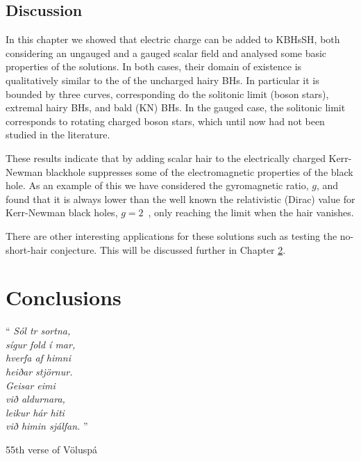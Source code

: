 \section{Discussion}
\label{sec_remarks}

In this chapter we showed that electric charge can be added to KBHsSH, both considering an ungauged and a gauged scalar field and analysed some basic properties of the solutions.
In both cases, their domain of existence is qualitatively similar to the of the uncharged hairy BHs.
In particular it is bounded by three curves, corresponding do the solitonic limit (boson stars), extremal hairy BHs, and bald (KN) BHs.
In the gauged case, the solitonic limit corresponds to rotating charged boson stars, which until now had not been studied in the literature. 

These results indicate that by adding scalar hair to the electrically charged Kerr-Newman blackhole suppresses some of the electromagnetic properties of the black hole.
As an example of this we have considered the gyromagnetic ratio, $g$, and found that it is always lower than the well known the relativistic (Dirac) value for Kerr-Newman black holes, $g=2$~\cite{Carter:1968rr}, only reaching the limit when the hair vanishes.

There are other interesting applications for these solutions such as testing the no-short-hair conjecture.
This will be discussed further in Chapter \ref{ch:conclusions}.
\chapter{Conclusions}
\label{ch:conclusions}

\epigraph{``\emph{
Sól tr sortna, \\
sígur fold í mar, \\
hverfa af himni \\
heiðar stjörnur. \\
Geisar eimi \\
við aldurnara, \\
leikur hár hiti \\
við himin sjálfan. 
} 
''}{55th verse of Völuspá}


